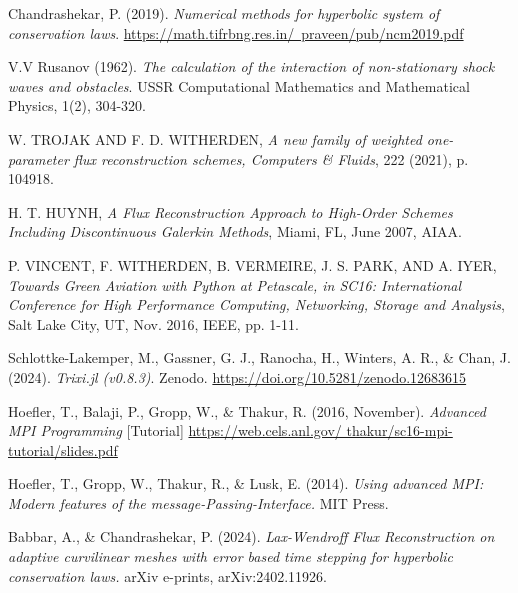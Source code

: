 \begin{thebibliography}{100}
Chandrashekar, P. (2019). {\em Numerical methods for hyperbolic system of conservation laws}. \href{https://math.tifrbng.res.in/~praveen/pub/ncm2019.pdf}{https://math.tifrbng.res.in/~praveen/pub/ncm2019.pdf}

V.V Rusanov (1962). {\em The calculation of the interaction of non-stationary shock waves and obstacles}. USSR Computational Mathematics and Mathematical Physics, 1(2), 304-320.

W. TROJAK AND F. D. WITHERDEN, {\em A new family of weighted one-parameter flux reconstruction schemes, Computers \& Fluids}, 222 (2021), p. 104918.

H. T. HUYNH, {\em A Flux Reconstruction Approach to High-Order Schemes Including Discontinuous Galerkin Methods}, Miami, FL, June 2007, AIAA.

P. VINCENT, F. WITHERDEN, B. VERMEIRE, J. S. PARK, AND A. IYER, {\em Towards Green Aviation with Python at Petascale, in SC16: International Conference for High Performance Computing, Networking, Storage and Analysis}, Salt Lake City, UT, Nov. 2016, IEEE, pp. 1-11.

Schlottke-Lakemper, M., Gassner, G. J., Ranocha, H., Winters, A. R., \& Chan, J. (2024). {\em Trixi.jl (v0.8.3)}. Zenodo. \href{https://doi.org/10.5281/zenodo.12683615}{https://doi.org/10.5281/zenodo.12683615}

Hoefler, T., Balaji, P., Gropp, W., \& Thakur, R. (2016, November). \textit{Advanced MPI Programming} [Tutorial] \href{https://web.cels.anl.gov/ thakur/sc16-mpi-tutorial/slides.pdf}{https://web.cels.anl.gov/ thakur/sc16-mpi-tutorial/slides.pdf}

Hoefler, T., Gropp, W., Thakur, R., \& Lusk, E. (2014). \textit{Using advanced MPI: Modern features of the message-Passing-Interface.} MIT Press.

Babbar, A., \& Chandrashekar, P. (2024). \textit{Lax-Wendroff Flux Reconstruction on adaptive curvilinear meshes with error based time stepping for hyperbolic conservation laws.} arXiv e-prints, arXiv:2402.11926.

\end{thebibliography}